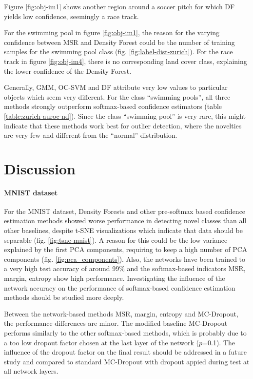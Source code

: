 \documentclass[10pt]{article}
\begin{document}
Figure \ref{fig:obj-im1} shows another region around a soccer pitch for which \gls{DF} yields low confidence, seemingly a race track.


For the swimming pool in figure \ref{fig:obj-im1}, the reason for the varying confidence between MSR and Density Forest could be the number of training samples for the swimming pool class (fig. \ref{fig:label-dist-zurich}). For the race track in figure \ref{fig:obj-im4}, there is no corresponding land cover class, explaining the lower confidence of the Density Forest. 

Generally, \gls{GMM}, \gls{OC-SVM} and \gls{DF} attribute very low values to particular objects which seem very different. For the class ``swimming pools'', all three methods strongly outperform softmax-based confidence estimators (table \ref{table:zurich-auroc-nd}). Since the class ``swimming pool'' is very rare, this might indicate that these methods work best for outlier detection, where the novelties are very few and different from the ``normal'' distribution.

\section{Discussion}
\label{sec:discussion}

\paragraph{MNIST dataset} For the MNIST dataset, Density Forests and other pre-softmax based confidence estimation methods showed worse performance in detecting novel classes than all other baselines, despite \gls{t-SNE} visualizations which indicate that data should be separable (fig. \ref{fig:tsne-mnist}). A reason for this could be the low variance explained by the first \gls{PCA} components, requiring to keep a high number of PCA components (fig. \ref{fig:pca_components}). Also, the networks have been trained to a very high test accuracy of around 99\% and the softmax-based indicators \gls{MSR}, margin, entropy show high performance. Investigating the influence of the network accuracy on the performance of softmax-based confidence estimation methods should be studied more deeply. 

Between the network-based methods \gls{MSR}, margin, entropy and \gls{MC-Dropout}, the performance differences are minor. The modified baseline \gls{MC-Dropout} performs similarly to the other softmax-based methods, which is probably due to a too low dropout factor chosen at the last layer of the network ($p$=0.1). The influence of the dropout factor on the final result should be addressed in a future study and compared to standard \gls{MC-Dropout} with dropout appied during test at all network layers.
\end{document}
